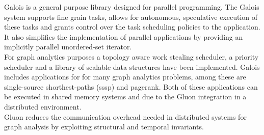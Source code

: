 
Galois \cite{Galois} is a general purpose library designed for parallel programming. The Galois system supports fine grain tasks, allows for autonomous, speculative execution of these tasks and grants control over the task scheduling policies to the application. It also simplifies the implementation of parallel applications by providing an implicitly parallel unordered-set iterator.\\
For graph analytics purposes a topology aware work stealing scheduler, a priority scheduler and a library of scalable data structures have been implemented. Galois includes applications for for many graph analytics problems, among these are single-source shorthest-paths (sssp) and pagerank. Both of these applications can be executed in shared memory systems and due to the Gluon integration in a distributed environment.\\
Gluon \cite{vertGalois} reduces the communication overhead needed in distributed systems for graph analysis by exploiting structural and temporal invariants.
